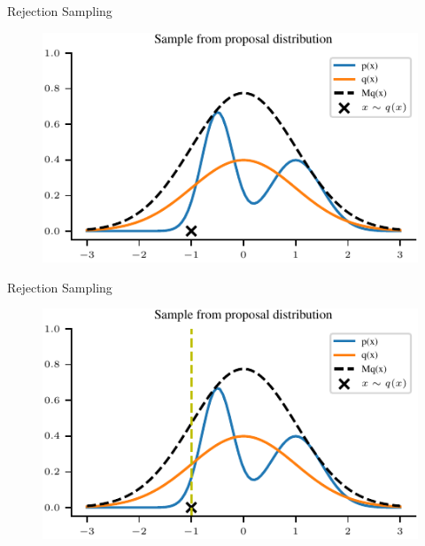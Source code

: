 \documentclass[handout]{beamer}
\begin{document}
    \begin{frame}{Rejection Sampling}
        \begin{figure}
            \centering
            \includegraphics{../figures/sampling/rejection-sampling--1.0-True-True-True-False-False-False-False-False.pdf}
        \end{figure}
    \end{frame}

    \begin{frame}{Rejection Sampling}
        \begin{figure}
            \centering
            \includegraphics{../figures/sampling/rejection-sampling--1.0-True-True-True-True-False-False-False-False.pdf}
        \end{figure}
    \end{frame}
\end{document}
